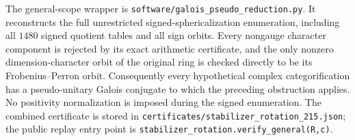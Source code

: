 The general-scope wrapper is
\texttt{software/galois\_pseudo\_reduction.py}.  It reconstructs the full
unrestricted signed-sphericalization enumeration, including all $1480$
signed quotient tables and all sign orbits.  Every nongauge character
component is rejected by its exact arithmetic certificate, and the only
nonzero dimension-character orbit of the original ring is checked directly
to be its Frobenius--Perron orbit.  Consequently every hypothetical complex
categorification has a pseudo-unitary Galois conjugate to which the preceding
obstruction applies.  No positivity normalization is imposed during the
signed enumeration.  The combined certificate is stored in
\texttt{certificates/stabilizer\_rotation\_215.json}; the public replay entry
point is \texttt{stabilizer\_rotation.verify\_general(R,c)}.
